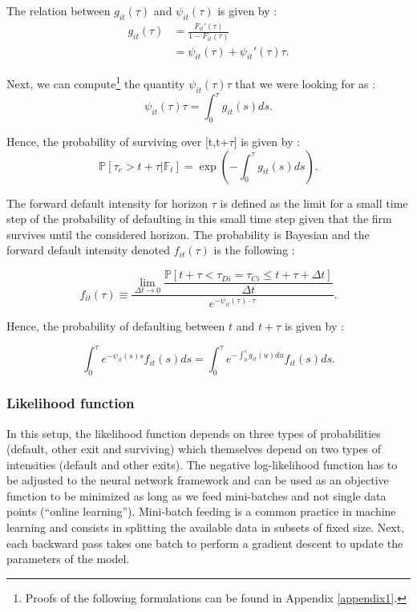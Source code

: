 \noindent The relation between $g_{it}(\tau)$ and $\psi_{it}(\tau)$  is given by :
\begin{align} \label{gphi}
    g_{it}(\tau) &= \frac{F_{it}'(\tau)}{1-F_{it}(\tau)} \nonumber \\
    &= \psi_{it}(\tau) + \psi_{it}'(\tau)\tau.
\end{align}

\noindent Next, we can compute\footnote{Proofs of the following formulations can be found in Appendix \ref{appendix1}.} the quantity $\psi_{it}(\tau) \tau$ that we were looking for as :
\begin{equation}
    \psi_{it}(\tau) \tau = \int_0^{\tau}g_{it}(s) ds.
\end{equation}

\noindent Hence, the probability of surviving over [t,t+$\tau$] is given by :
\begin{equation} \label{survprob}
    \mathbb{P}[\tau_c > t+\tau |\mathbb{F}_t] = \exp(-\int_0^\tau g_{it}(s) ds).
\end{equation}

The forward default intensity for horizon $\tau$ is defined as the limit for a small time step of the probability of defaulting in this small time step given that the firm survives until the considered horizon. The probability is Bayesian and the forward default intensity denoted $f_{it}(\tau)$ is the following :

\begin{equation}
f_{it}(\tau) \equiv \dfrac{\lim_{\Delta t\to 0} \dfrac{\mathbb{P}[t + \tau < \tau_{Di}=\tau_{Ci} \leq t+ \tau + \Delta t]}{\Delta t}}{e^{-\psi_{it}(\tau)\cdot\tau}}.
\end{equation}

Hence, the probability of defaulting between $t$ and $t+\tau$ is given by :

\begin{equation}\label{probdef}
\int_0^{\tau} e^{-\psi_{it}(s)s} f_{it}(s)ds = \int_0^{\tau} e^{-\int_0^s g_{it}(u) du} f_{it}(s)ds.
\end{equation}


\subsubsection{Likelihood function}
\label{SSS:2-1-2}

In this setup, the likelihood function depends on three types of probabilities (default, other exit and surviving) which themselves depend on two types of intensities (default and other exits). The negative log-likelihood function has to be adjusted to the neural network framework and can be used as an objective function to be minimized as long as we feed mini-batches and not single data points (``online learning''). Mini-batch feeding is a common practice in machine learning and consists in splitting the available data in subsets of fixed size. Next, each backward pass takes one batch to perform a gradient descent to update the parameters of the model. \\


